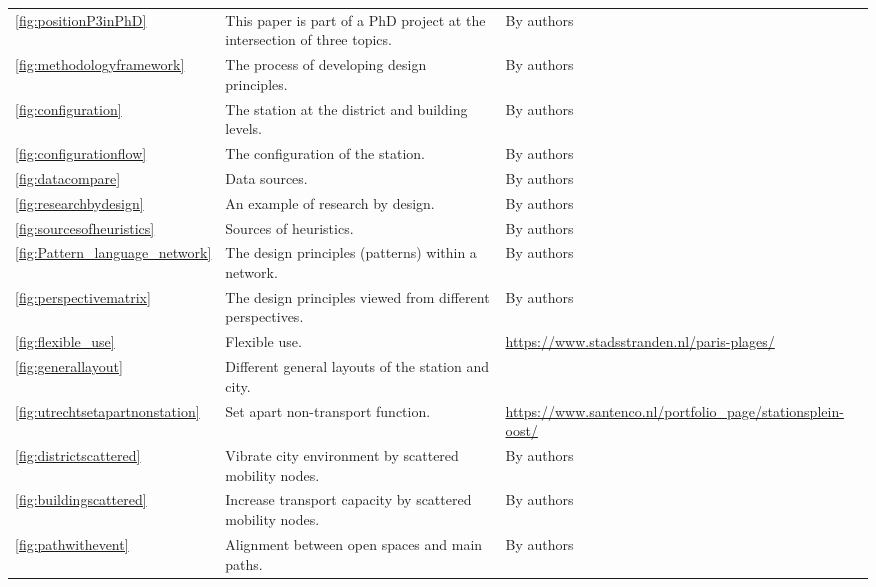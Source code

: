 \documentclass[]{article}
\begin{document}
\begin{xltabular}{\textwidth}{p{0.01\textwidth} p{0.42\textwidth} p{0.50\textwidth}}
\ref{fig:positionP3inPhD} & This paper is part of a PhD project at the intersection of three topics. & By authors \\

\ref{fig:methodologyframework} &  The process of developing design principles. & By authors \\

\ref{fig:configuration} &  The station at the district and building levels. & By authors \\

\ref{fig:configurationflow} & The configuration of the station. & By authors \\

\ref{fig:datacompare} & Data sources. & By authors \\

\ref{fig:researchbydesign} & An example of research by design. & By authors \\

\ref{fig:sourcesofheuristics} & Sources of heuristics. & By authors \\

\ref{fig:Pattern_language_network} & The design principles (patterns) within a network. & By authors \\

\ref{fig:perspectivematrix} & The design principles viewed from different perspectives. & By authors \\



\ref{fig:flexible_use} & Flexible use. & \url{https://www.stadsstranden.nl/paris-plages/} \\

\ref{fig:generallayout} & Different general layouts of the station and city. & \citep{qiAnalysisStationCitySynergetic2019} \\

\ref{fig:utrechtsetapartnonstation} & Set apart non-transport function. & \url{https://www.santenco.nl/portfolio_page/stationsplein-oost/} \\

\ref{fig:districtscattered} & Vibrate city environment by scattered mobility nodes. & By authors \\

\ref{fig:buildingscattered} & Increase transport capacity by scattered mobility nodes. & By authors \\

\ref{fig:pathwithevent} & Alignment between open spaces and main paths. & By authors \\


\end{xltabular}
\end{document}
